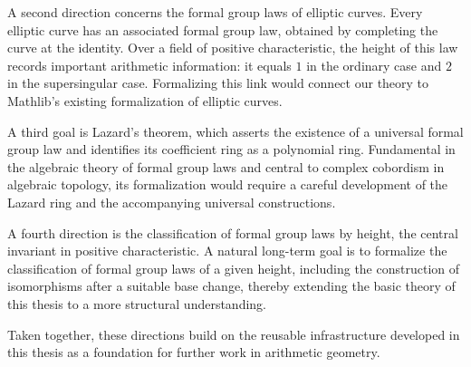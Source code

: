 A second direction concerns the formal group laws of elliptic curves.
Every elliptic curve has an associated formal group law, obtained by
completing the curve at the identity.  Over a field of positive
characteristic, the height of this law records important arithmetic
information: it equals $1$ in the ordinary case and $2$ in the
supersingular case.  Formalizing this link would connect our theory to
Mathlib's existing formalization of elliptic curves.

A third goal is Lazard's theorem, which asserts the existence of a
universal formal group law and identifies its coefficient ring as a
polynomial ring.  Fundamental in the algebraic theory of formal group
laws and central to complex cobordism in algebraic topology, its
formalization would require a careful development of the Lazard ring and
the accompanying universal constructions.

A fourth direction is the classification of formal group laws by height,
the central invariant in positive characteristic.  A natural long-term
goal is to formalize the classification of formal group laws of a given
height, including the construction of isomorphisms after a suitable base
change, thereby extending the basic theory of this thesis to a more
structural understanding.

Taken together, these directions build on the reusable infrastructure
developed in this thesis as a foundation for further work in arithmetic
geometry.